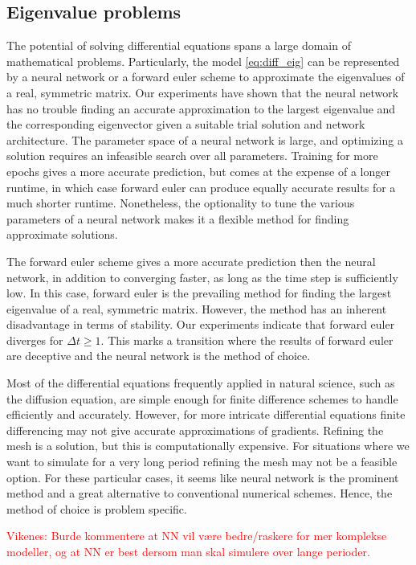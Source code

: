 \documentclass[12pt]{extarticle}
\begin{document}
\subsection{Eigenvalue problems}
The potential of solving differential equations spans a large domain of mathematical problems. Particularly, the model \eqref{eq:diff_eig} can be represented by a neural network or a forward euler scheme to approximate the eigenvalues of a real, symmetric matrix. Our experiments have shown that the neural network has no trouble finding an accurate approximation to the largest eigenvalue and the corresponding eigenvector given a suitable trial solution and network architecture. The parameter space of a neural network is large, and optimizing a solution requires an infeasible search over all parameters. Training for more epochs gives a more accurate prediction, but comes at the expense of a longer runtime, in which case forward euler can produce equally accurate results for a much shorter runtime. Nonetheless, the optionality to tune the various parameters of a neural network makes it a flexible method for finding approximate solutions.

The forward euler scheme gives a more accurate prediction then the neural network, in addition to converging faster, as long as the time step is sufficiently low. In this case, forward euler is the prevailing method for finding the largest eigenvalue of a real, symmetric matrix. However, the method has an inherent disadvantage in terms of stability. Our experiments indicate that forward euler diverges for $\Delta t \ge 1$. This marks a transition where the results of forward euler are deceptive and the neural network is the method of choice.

Most of the differential equations frequently applied in natural science, such as the diffusion equation, are simple enough for finite difference schemes to handle efficiently and accurately. However, for more intricate differential equations finite differencing may not give accurate approximations of gradients. Refining the mesh is a solution, but this is computationally expensive. For situations where we want to simulate for a very long period refining the mesh may not be a feasible option. For these particular cases, it seems like neural network is the prominent method and a great alternative to conventional numerical schemes. Hence, the method of choice is problem specific. 

\textcolor{red}{Vikenes: Burde kommentere at NN vil være bedre/raskere for mer komplekse modeller, og at NN er best dersom man skal simulere over lange perioder.}
\end{document}

